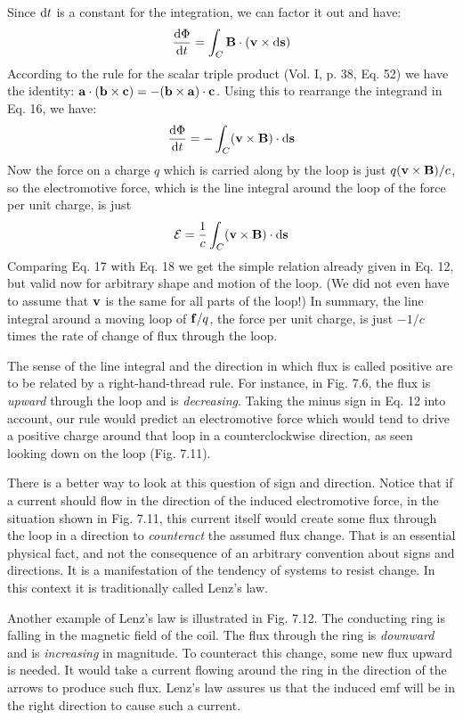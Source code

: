 Since $\textup{d} t$ is a constant for the integration, we can factor it out and
have:
\begin{equation}
  \frac{\textup{d}\Phi}{\textup{d} t} = \int_C \mathbf{B}\cdot(\mathbf{v}\times\textup{d}\mathbf{s})
\end{equation}
According to the rule for the scalar triple product (Vol. I, p. 38,
Eq. 52) we have the identity: $\mathbf{a}\cdot (\mathbf{b} \times \mathbf{c}) = - (\mathbf{b} \times \mathbf{a}) \cdot \mathbf{c}$.
Using this to rearrange the integrand in Eq. 16, we have:
\begin{equation}
  \frac{\textup{d}\Phi}{\textup{d} t} = - \int_C (\mathbf{v}\times\mathbf{B})\cdot\textup{d}\mathbf{s}
\end{equation}
Now the force on a charge $q$ which is carried along by the loop is just
$q(\mathbf{v} \times \mathbf{B}) /c$, so the electromotive force, which is the line integral
around the loop of the force per unit charge, is just
\begin{equation}
  \mathcal{E} = \frac{1}{c} \int_C (\mathbf{v}\times\mathbf{B})\cdot\textup{d}\mathbf{s}
\end{equation}
Comparing Eq. 17 with Eq. 18 we get the simple relation already
given in Eq. 12, but valid now for arbitrary shape and motion of the
loop. (We did not even have to assume that $\mathbf{v}$ is the same for all
parts of the loop!) In summary, the line integral around a moving
loop of $\mathbf{f}/q$, the force per unit charge, is just $-1/c$ times the rate of
change of flux through the loop.

The sense of the line integral and the direction in which flux is
called positive are to be related by a right-hand-thread rule. For
instance, in Fig. 7.6, the flux is \emph{upward} through the loop and is
\emph{decreasing}. Taking the minus sign in Eq. 12 into account, our rule
would predict an electromotive force which would tend to drive a
positive charge around that loop in a counterclockwise direction, as
seen looking down on the loop (Fig. 7.11).

There is a better way to look at this question of sign and direction.
Notice that if a current should flow in the direction of the induced
electromotive force, in the situation shown in Fig. 7.11, this current
itself would create some flux through the loop in a direction to
\emph{counteract} the assumed flux change. That is an essential physical
fact, and not the consequence of an arbitrary convention about signs
and directions. It is a manifestation of the tendency of systems to
resist change. In this context it is traditionally called Lenz's law.

Another example of Lenz's law is illustrated in Fig. 7.12. The
conducting ring is falling in the magnetic field of the coil. The flux
through the ring is \emph{downward} and is \emph{increasing} in magnitude. To
counteract this change, some new flux upward is needed. It would
take a current flowing around the ring in the direction of the arrows
to produce such flux. Lenz's law assures us that the induced emf will
be in the right direction to cause such a current.

